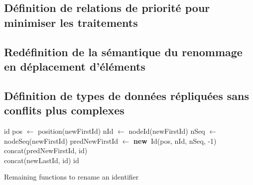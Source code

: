 \documentclass[12pt]{thesul}
\newcommand{\new}{\textbf{new}}
\begin{document}
\subsection{Définition de relations de priorité pour minimiser les traitements}
\subsection{Redéfinition de la sémantique du renommage en déplacement d'éléments}
\subsection{Définition de types de données répliquées sans conflits plus complexes}
% 

% 

\label{app:rename-id}

\begin{algorithm}[!ht]
  \footnotesize
  \begin{algorithmic}
          \State \Return id
      \Else
          \State pos $\gets$ position(newFirstId)
          \State nId $\gets$ nodeId(newFirstId)
          \State nSeq $\gets$ nodeSeq(newFirstId)
          \State predNewFirstId $\gets$ \new~Id(pos, nId, nSeq, -1)
          \\
          \State \Return concat(predNewFirstId, id)
          \EndIf
      \EndFunction
      \\
              \State \Return concat(newLastId, id)
          \Else
              \State \Return id
          \EndIf
      \EndFunction
  \end{algorithmic}
  \caption{Remaining functions to rename an identifier}
  \label{alg:appendix-rename-id}
\end{algorithm}


\label{app:revert-rename-id}
\end{document}
